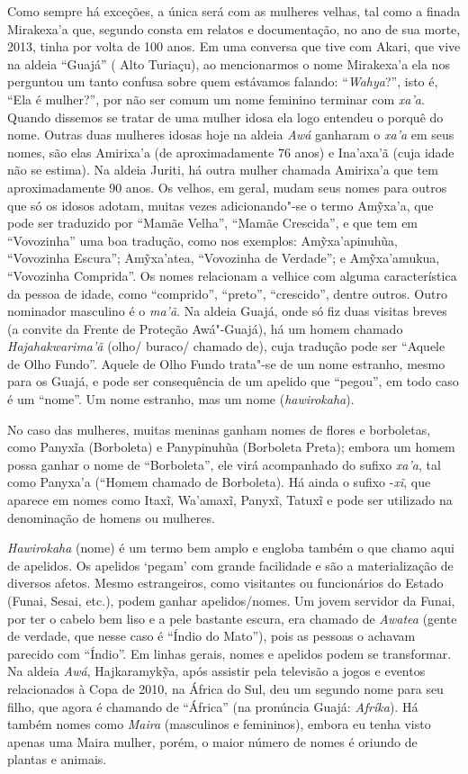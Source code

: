 Como sempre há exceções, a única será com as mulheres velhas, tal como a
finada Mirakexa'a que, segundo consta em relatos e documentação, no ano
de sua morte, 2013, tinha por volta de 100 anos. Em uma conversa que
tive com Akari, que vive na aldeia ``Guajá'' ( Alto Turiaçu), ao
mencionarmos o nome Mirakexa'a ela nos perguntou um tanto confusa sobre
quem estávamos falando: ``\emph{Wahya}?'', isto é, ``Ela é mulher?'',
por não ser comum um nome feminino terminar com \emph{xa'a}. Quando
dissemos se tratar de uma mulher idosa ela logo entendeu o porquê do
nome. Outras duas mulheres idosas hoje na aldeia \emph{Awá} ganharam o
\emph{xa'a} em seus nomes, são elas Amirixa'a (de aproximadamente 76
anos) e Ina'axa'ã (cuja idade não se estima). Na aldeia Juriti, há outra
mulher chamada Amirixa'a que tem aproximadamente 90 anos. Os velhos, em
geral, mudam seus nomes para outros que só os idosos adotam, muitas
vezes adicionando"-se o termo Amỹxa'a, que pode ser traduzido por ``Mamãe
Velha'', ``Mamãe Crescida'', e que tem em ``Vovozinha'' uma boa
tradução, como nos exemplos: Amỹxa'apinuhũa, ``Vovozinha Escura'';
Amỹxa'atea, ``Vovozinha de Verdade''; e Amỹxa'amukua, ``Vovozinha
Comprida''. Os nomes relacionam a velhice com alguma característica da
pessoa de idade, como ``comprido'', ``preto'', ``crescido'', dentre
outros. Outro nominador masculino é o \emph{ma'ã}. Na aldeia Guajá, onde
só fiz duas visitas breves (a convite da Frente de Proteção Awá"-Guajá),
há um homem chamado \emph{Hajahakwarima'ã} (olho/ buraco/ chamado de),
cuja tradução pode ser ``Aquele de Olho Fundo''. Aquele de Olho Fundo
trata"-se de um nome estranho, mesmo para os Guajá, e pode ser
consequência de um apelido que ``pegou'', em todo caso é um ``nome''. Um
nome estranho, mas um nome (\emph{hawirokaha}).

No caso das mulheres, muitas meninas ganham nomes de flores e
borboletas, como Panyxĩa (Borboleta) e Panypinuhũa (Borboleta Preta);
embora um homem possa ganhar o nome de ``Borboleta'', ele virá
acompanhado do sufixo \emph{xa'a}, tal como Panyxa'a (``Homem chamado de
Borboleta). Há ainda o sufixo -\emph{xĩ}, que aparece em nomes como
Itaxĩ, Wa'amaxĩ, Panyxĩ, Tatuxĩ e pode ser utilizado na denominação de
homens ou mulheres.

\emph{Hawirokaha} (nome) é um termo bem amplo e engloba também o que
chamo aqui de apelidos. Os apelidos `pegam' com grande facilidade e são
a materialização de diversos afetos. Mesmo estrangeiros, como visitantes
ou funcionários do Estado (Funai, Sesai, etc.), podem ganhar
apelidos/nomes. Um jovem servidor da Funai, por ter o cabelo bem liso e
a pele bastante escura, era chamado de \emph{Awatea} (gente de verdade,
que nesse caso é ``Índio do Mato''), pois as pessoas o achavam parecido
com ``Índio''. Em linhas gerais, nomes e apelidos podem se transformar.
Na aldeia \emph{Awá}, Hajkaramykỹa, após assistir pela televisão a jogos
e eventos relacionados à Copa de 2010, na África do Sul, deu um segundo
nome para seu filho, que agora é chamando de ``África'' (na pronúncia
Guajá: \emph{Afríka}). Há também nomes como \emph{Maira} (masculinos e
femininos), embora eu tenha visto apenas uma Maira mulher, porém, o
maior número de nomes é oriundo de plantas e animais.

